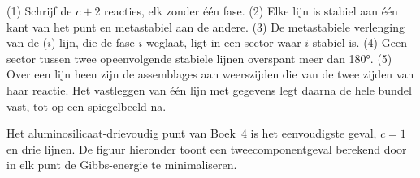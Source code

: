 \begin{method}\label{met:b3:petrological-thermodynamics:schreinemakers}
(1) Schrijf de $c + 2$ reacties, elk zonder één fase. (2) Elke lijn is
stabiel aan één kant van het punt en metastabiel aan de andere. (3) De
metastabiele verlenging van de ($i$)-lijn, die de fase $i$ weglaat, ligt in een
sector waar $i$ stabiel is. (4) Geen sector tussen twee opeenvolgende stabiele lijnen
overspant meer dan \ang{180}. (5) Over een lijn heen zijn de assemblages aan weerszijden
die van de twee zijden van haar reactie. Het vastleggen van één lijn met gegevens
legt daarna de hele bundel vast, tot op een spiegelbeeld na.
\end{method}

Het aluminosilicaat-drievoudig punt van Boek~4 is het eenvoudigste geval,
$c = 1$ en drie lijnen. De figuur hieronder toont een tweecomponentgeval
berekend door in elk punt de Gibbs-energie te minimaliseren.

